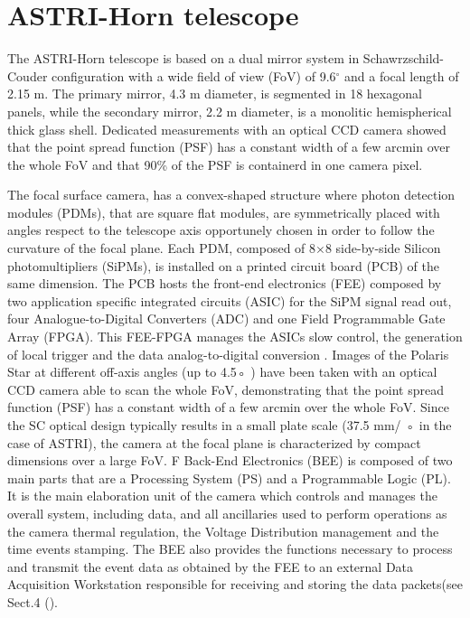 \section{ASTRI-Horn telescope} 
The ASTRI-Horn telescope is based on a dual mirror system in Schawrzschild-Couder configuration
with a wide field of view (FoV) of 9.6$^\circ$ and a focal length of 2.15 m. 
The primary mirror, 4.3 m diameter, is segmented in 18 hexagonal panels, 
while the secondary mirror, 2.2 m diameter, is a monolitic hemispherical thick glass shell. 
Dedicated measurements  with an optical CCD camera showed that the
point spread function (PSF) has a constant width of a few arcmin
over the whole FoV and that  90\% of the PSF  is containerd in one camera pixel. 

The focal surface camera, has a convex-shaped structure where
photon detection modules (PDMs), that are square flat modules, are symmetrically placed
with angles respect to the telescope axis 
opportunely chosen in order to follow the curvature of the focal plane.
Each PDM, composed of 8$\times$8 side-by-side Silicon photomultipliers (SiPMs), 
is installed on a printed circuit board (PCB)  of the same dimension.
The PCB hosts the front-end electronics (FEE) composed by
 two application specific integrated circuits (ASIC) for the SiPM signal read out,
four Analogue-to-Digital Converters (ADC) and one Field Programmable
Gate Array (FPGA). This FEE-FPGA manages the ASICs slow control,
the generation of local trigger and the data analog-to-digital conversion \cite{Sottile2016}.
 Images of the Polaris Star at different off-axis angles (up to 4.5◦
) have been taken with an optical
CCD camera able to scan the whole FoV, demonstrating that the
point spread function (PSF) has a constant width of a few arcmin
over the whole FoV.
Since the SC optical design typically results in a small
plate scale (37.5 mm/
◦
in the case of ASTRI), the camera at
the focal plane is characterized by compact dimensions over a
large FoV. F Back-End Electronics (BEE) is composed of two main parts that are
a Processing System (PS) and a Programmable Logic (PL). 
It is the main elaboration unit of the camera which
controls and manages the overall system, including data, and
all ancillaries used to perform operations as
the camera thermal regulation, 
the Voltage Distribution management and the time events stamping.
The BEE also provides the functions necessary to
process and transmit the event data as 
obtained by the FEE to an external Data Acquisition 
Workstation responsible for receiving and storing
the data packets(see Sect.4 (\cite{Sottile2016}).
